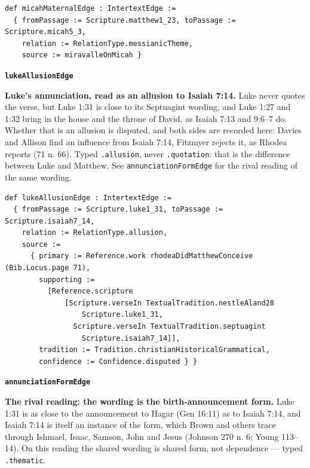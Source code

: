 \documentclass[11pt]{article}
\begin{document}
{\small\begin{verbatim}
def micahMaternalEdge : IntertextEdge :=
  { fromPassage := Scripture.matthew1_23, toPassage := Scripture.micah5_3,
    relation := RelationType.messianicTheme,
    source := miravalleOnMicah }
\end{verbatim}}
\par\medskip\noindent\textbf{\texttt{luke\allowbreak{}Allusion\allowbreak{}Edge}}\par\nobreak\noindent
\textbf{Luke’s annunciation, read as an allusion to Isaiah 7:14.} Luke never quotes the verse, but Luke 1:31 is close to its Septuagint wording, and Luke 1:27 and 1:32 bring in the house and the throne of David, as Isaiah 7:13 and 9:6–7 do. Whether that is an allusion is disputed, and both sides are recorded here: Davies and Allison find an influence from Isaiah 7:14, Fitzmyer rejects it, as Rhodea reports (71 n. 66). Typed \texttt{.allusion}, never \texttt{.quotation}: that is the difference between Luke and Matthew. See \texttt{annunciation\allowbreak{}Form\allowbreak{}Edge} for the rival reading of the same wording.

{\small\begin{verbatim}
def lukeAllusionEdge : IntertextEdge :=
  { fromPassage := Scripture.luke1_31, toPassage := Scripture.isaiah7_14,
    relation := RelationType.allusion,
    source :=
      { primary := Reference.work rhodeaDidMatthewConceive (Bib.Locus.page 71),
        supporting :=
          [Reference.scripture
              [Scripture.verseIn TextualTradition.nestleAland28
                  Scripture.luke1_31,
                Scripture.verseIn TextualTradition.septuagint
                  Scripture.isaiah7_14]],
        tradition := Tradition.christianHistoricalGrammatical,
        confidence := Confidence.disputed } }
\end{verbatim}}
\par\medskip\noindent\textbf{\texttt{annunciation\allowbreak{}Form\allowbreak{}Edge}}\par\nobreak\noindent
\textbf{The rival reading: the wording is the birth-announcement form.} Luke 1:31 is as close to the announcement to Hagar (Gen 16:11) as to Isaiah 7:14, and Isaiah 7:14 is itself an instance of the form, which Brown and others trace through Ishmael, Isaac, Samson, John and Jesus (Johnson 270 n. 6; Young 113–14). On this reading the shared wording is shared form, not dependence — typed \texttt{.thematic}.
\end{document}
